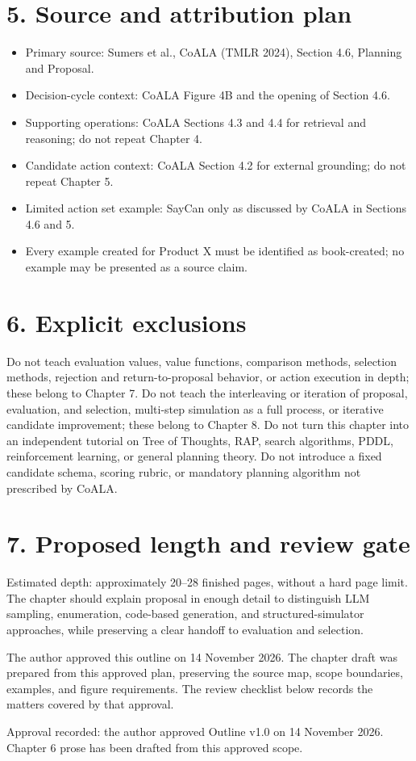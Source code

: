 \section*{5. Source and attribution plan}
\begin{itemize}
  \item Primary source: Sumers et al., CoALA (TMLR 2024), Section 4.6, Planning and Proposal.
  \item Decision-cycle context: CoALA Figure 4B and the opening of Section 4.6.
  \item Supporting operations: CoALA Sections 4.3 and 4.4 for retrieval and reasoning; do not repeat Chapter 4.
  \item Candidate action context: CoALA Section 4.2 for external grounding; do not repeat Chapter 5.
  \item Limited action set example: SayCan only as discussed by CoALA in Sections 4.6 and 5.
  \item Every example created for Product X must be identified as book-created; no example may be presented as a source claim.
\end{itemize}

\section*{6. Explicit exclusions}
Do not teach evaluation values, value functions, comparison methods, selection methods, rejection and return-to-proposal behavior, or action execution in depth; these belong to Chapter 7. Do not teach the interleaving or iteration of proposal, evaluation, and selection, multi-step simulation as a full process, or iterative candidate improvement; these belong to Chapter 8. Do not turn this chapter into an independent tutorial on Tree of Thoughts, RAP, search algorithms, PDDL, reinforcement learning, or general planning theory. Do not introduce a fixed candidate schema, scoring rubric, or mandatory planning algorithm not prescribed by CoALA.

\section*{7. Proposed length and review gate}
Estimated depth: approximately 20--28 finished pages, without a hard page limit. The chapter should explain proposal in enough detail to distinguish LLM sampling, enumeration, code-based generation, and structured-simulator approaches, while preserving a clear handoff to evaluation and selection.

\begin{takeawaybox}
The author approved this outline on 14 November 2026. The chapter draft was prepared from this approved plan, preserving the source map, scope boundaries, examples, and figure requirements. The review checklist below records the matters covered by that approval.

Approval recorded: the author approved Outline v1.0 on 14 November 2026. Chapter 6 prose has been drafted from this approved scope.
\end{takeawaybox}


